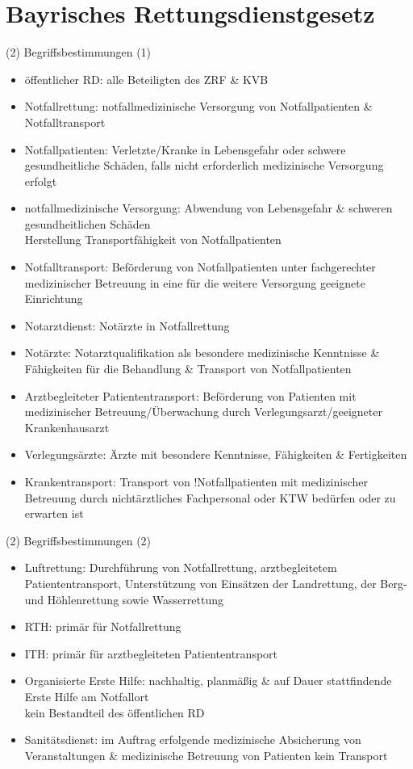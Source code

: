 \section{Bayrisches Rettungsdienstgesetz}
\begin{sectionbox}{(2) Begriffsbestimmungen (1)}
    \begin{itemize}
        \item öffentlicher RD: alle Beteiligten des ZRF \& KVB
        \item Notfallrettung: notfallmedizinische Versorgung von Notfallpatienten \& Notfalltransport
        \item Notfallpatienten: Verletzte/Kranke in Lebensgefahr oder schwere gesundheitliche Schäden, falls nicht erforderlich medizinische Versorgung erfolgt 
        \item notfallmedizinische Versorgung: Abwendung von Lebensgefahr \& schweren gesundheitlichen Schäden\\
        \ra Herstellung Transportfähigkeit von Notfallpatienten
        \item Notfalltransport: Beförderung von Notfallpatienten unter fachgerechter medizinischer Betreuung in eine für die weitere Versorgung geeignete Einrichtung
        \item Notarztdienst: Notärzte in Notfallrettung
        \item Notärzte: Notarztqualifikation als besondere medizinische Kenntnisse \& Fähigkeiten für die Behandlung \& Transport von Notfallpatienten
        \item Arztbegleiteter Patiententransport: Beförderung von Patienten mit medizinischer Betreuung/Überwachung durch Verlegungsarzt/geeigneter Krankenhausarzt
        \item Verlegungsärzte: Ärzte mit besondere Kenntnisse, Fähigkeiten \& Fertigkeiten
        \item Krankentransport: Transport von !Notfallpatienten mit medizinischer Betreuung durch nichtärztliches Fachpersonal oder KTW bedürfen oder zu erwarten ist
    \end{itemize}
\end{sectionbox}
\begin{sectionbox}{(2) Begriffsbestimmungen (2)}
    \begin{itemize}
        \item Luftrettung: Durchführung von Notfallrettung, arztbegleitetem Patiententransport, Unterstützung von Einsätzen der Landrettung, der Berg- und Höhlenrettung sowie Wasserrettung
        \item RTH: primär für Notfallrettung
        \item ITH: primär für arztbegleiteten Patiententransport 
        \item Organisierte Erste Hilfe: nachhaltig, planmäßig \& auf Dauer stattfindende Erste Hilfe am Notfallort\\
        \ra kein Bestandteil des öffentlichen RD
        \item Sanitätsdienst: im Auftrag erfolgende medizinische Absicherung von Veranstaltungen \& medizinische Betreuung von Patienten \ra kein Transport
    \end{itemize}
\end{sectionbox}
